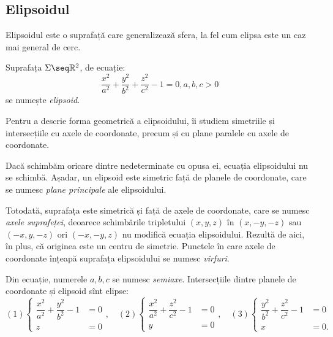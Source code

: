 
\subsection{Elipsoidul}

\indent\indent Elipsoidul este o suprafață care generalizează sfera, la fel cum
elipsa este un caz mai general de cerc.

\begin{definition}

	Suprafața $\Sigma \seq \mathbb{R}^2$, de ecuație: 
 \[
	\dfrac{x^2}{a^2} + \dfrac{y^2}{b^2} + \dfrac{z^2}{c^2} - 1 = 0, a, b, c > 0
\]
se numește \emph{elipsoid.}
\end{definition}

Pentru a descrie forma geometrică a elipsoidului, îi studiem simetriile și
intersecțiile cu axele de coordonate, precum și cu plane paralele cu axele de
coordonate.

Dacă schimbăm oricare dintre nedeterminate cu opusa ei, ecuația elipsoidului
nu se schimbă. Așadar, un elipsoid este simetric față de planele de coordonate,
care se numesc \emph{plane principale} ale elipsoidului.


Totodată, suprafața este simetrică și față de axele de coordonate, care se 
numesc \emph{axele suprafeței}, deoarece schimbările tripletului $(x, y, z)$
în $(x, -y, -z)$ sau $(-x, y, -z)$ ori $(-x, -y, z)$ nu modifică ecuația 
elipsoidului. Rezultă de aici, în plus, că originea este un centru de simetrie.
Punctele în care axele de coordonate înțeapă suprafața elipsoidului se numesc
\emph{vîrfuri}.

Din ecuație, numerele $a, b, c$ se numesc \emph{semiaxe}. Intersecțiile
dintre planele de coordonate și elipsoid sînt elipse: 
 \[
	(1) \begin{cases}	
	         \dfrac{x^2}{a^2} + \dfrac{y^2}{b^2} - 1 &= 0 \\
	         z &= 0
        \end{cases}, \quad 
    (2) \begin{cases}	
           \dfrac{x^2}{a^2} + \dfrac{z^2}{c^2} - 1 &= 0 \\
           y &= 0
       \end{cases}, \quad 
    (3) \begin{cases}	
           \dfrac{y^2}{b^2} + \dfrac{z^2}{c^2} - 1 &= 0 \\
           x &= 0.
        \end{cases}
\]

